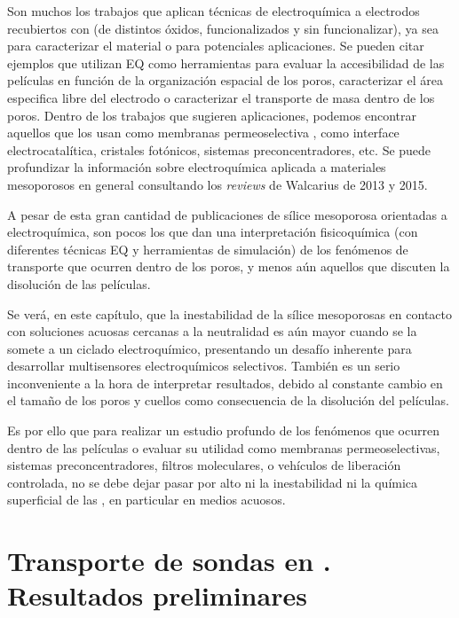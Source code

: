 	Son muchos los trabajos que aplican técnicas de electroquímica a electrodos recubiertos con \pdm\space (de distintos óxidos, funcionalizados y sin funcionalizar), ya sea para caracterizar el material o para potenciales aplicaciones. Se pueden citar ejemplos que utilizan EQ como herramientas para evaluar la accesibilidad de las películas en función de la organización espacial de los poros\cite{Etienne2007,Herzog2013,karman2016}, caracterizar el área especifica libre del electrodo \cite{Otal2006} o caracterizar el transporte de masa dentro de los poros\cite{Calvo2009,brunsen2011}. Dentro de los trabajos que sugieren aplicaciones, podemos encontrar aquellos que los usan como membranas permeoselectiva \cite{Fattakhova-Rohlfing2007,Andrieu-Brunsen2015,Calvo2009,nasir2018}, como interface electrocatalítica\cite{BaeJ.HanJ.Chung2012}, cristales fotónicos\cite{Gimenez2017}, sistemas preconcentradores\cite{Etienne2015,Gimenez2016-2}, etc. Se puede profundizar la información sobre electroquímica aplicada a materiales mesoporosos en general consultando los \textit{reviews} de Walcarius de 2013\cite{walcarius2013,Etienne2013} y 2015\cite{Etienne2015}.

	A pesar de esta gran cantidad de publicaciones de sílice mesoporosa orientadas a electroquímica, son pocos los que dan una interpretación fisicoquímica (con diferentes técnicas EQ y herramientas de simulación) de los fenómenos de transporte que ocurren dentro de los poros, y menos aún aquellos que discuten la disolución de las películas. 

	Se verá, en este capítulo, que la inestabilidad de la sílice mesoporosas en contacto con soluciones acuosas cercanas a la neutralidad es aún mayor cuando se la somete a un ciclado electroquímico, presentando un desafío inherente para desarrollar multisensores electroquímicos selectivos. También es un serio inconveniente a la hora de interpretar resultados, debido al constante cambio en el tamaño de los poros y cuellos como consecuencia de la disolución del películas. 

	Es por ello que para realizar un estudio profundo de los fenómenos que ocurren dentro de las películas o evaluar su utilidad como membranas permeoselectivas, sistemas preconcentradores, filtros moleculares, o vehículos de liberación controlada, no se debe dejar pasar por alto ni la inestabilidad ni la química superficial de las \pdm, en particular en medios acuosos. 
	
\section{Transporte de sondas en \pdm. Resultados preliminares}

